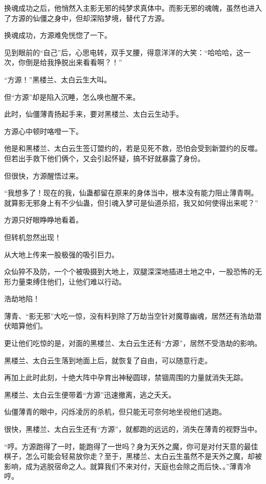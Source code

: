 \begin{this_body}
换魂成功之后，他悄然入主影无邪的纯梦求真体中。而影无邪的魂魄，虽然也进入了方源的仙僵之身中，但却深陷梦境，替代了方源。

换魂成功，方源难免恍惚了一下。

见到眼前的“自己”后，心思电转，双手叉腰，得意洋洋的大笑：“哈哈哈，这一次，你倒是给我挣脱出来看看啊？！”

“方源！”黑楼兰、太白云生大叫。

但“方源”却是陷入沉睡，怎么唤也醒不来。

此时，仙僵薄青扬起手来，要对黑楼兰、太白云生动手。

方源心中顿时咯噔一下。

他是和黑楼兰、太白云生签订盟约的，若是见死不救，恐怕会受到新盟约的反噬。但若出手救下他们俩个，又会引起怀疑，搞不好就暴露了身份。

但很快，方源醒悟过来。

“我想多了！现在的我，仙蛊都留在原来的身体当中，根本没有能力阻止薄青啊。就算影无邪身上有不少仙蛊，但引魂入梦可是仙道杀招，我又如何使得出来呢？”

方源只好眼睁睁地看着。

但转机忽然出现！

从大地上传来一股极强的吸引巨力。

众仙猝不及防，一个个被吸摄到大地上，双腿深深地插进土地之中，一股恐怖的无形力量束缚住他们，让他们难以行动。

浩劫地陷！

薄青、“影无邪”大吃一惊，没有料到除了万劫当空针对魔尊幽魂，居然还有浩劫潜伏暗算他们。

更让他们吃惊的是，对面的黑楼兰、太白云生还有“方源”，居然不受浩劫的影响。

黑楼兰、太白云生落到地面上后，就恢复了自由，可以随意行走。

再加上此时此刻，十绝大阵中孕育出神秘圆球，禁锢周围的力量就消失无踪。

黑楼兰、太白云生便带着“方源”迅速撤离，逃之夭夭。

仙僵薄青的眼中，闪烁凌厉的杀机，但只能无可奈何地坐视他们逃跑。

很快，黑楼兰、太白云生还有“方源”，就都跑的远远的，消失在薄青的视野当中。

“哼。方源跑得了一时，能跑得了一世吗？身为天外之魔，你可是对付天意的最佳棋子，怎么可能会轻易放你走？至于，黑楼兰、太白云生虽然不是天外之魔，却被影响，成为逃脱宿命之人。就算我们不来对付，天庭也会除之而后快、。”薄青冷哼。


\end{this_body}

